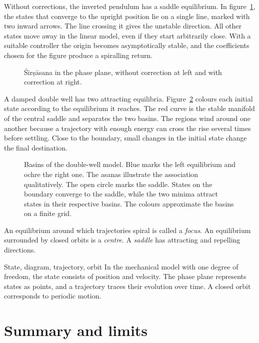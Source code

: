 Without corrections, the inverted pendulum has a saddle equilibrium. In figure~\ref{fig:selleafuochi}, the states that converge to the upright position lie on a single line, marked with two inward arrows. The line crossing it gives the unstable direction. All other states move away in the linear model, even if they start arbitrarily close. With a suitable controller the origin becomes asymptotically stable, and the coefficients chosen for the figure produce a spiralling return.

\begin{figure}
\caption{Śīrṣāsana in the phase plane, without correction at left and with correction at right.}
\label{fig:selleafuochi}
\end{figure}

A damped double well has two attracting equilibria. Figure~\ref{fig:bacini} colours each initial state according to the equilibrium it reaches. The red curve is the stable manifold of the central saddle and separates the two basins. The regions wind around one another because a trajectory with enough energy can cross the rise several times before settling. Close to the boundary, small changes in the initial state change the final destination.

\begin{figure}
\caption{Basins of the double-well model. Blue marks the left equilibrium and ochre the right one. The asanas illustrate the association qualitatively. The open circle marks the saddle. States on the boundary converge to the saddle, while the two minima attract states in their respective basins. The colours approximate the basins on a finite grid.}
\label{fig:bacini}
\end{figure}

An equilibrium around which trajectories spiral is called a \emph{focus}. An equilibrium surrounded by closed orbits is a \emph{centre}. A \emph{saddle} has attracting and repelling directions.

\begin{parola}{State, diagram, trajectory, orbit}
In the mechanical model with one degree of freedom, the state consists of position and velocity. The phase plane represents states as points, and a trajectory traces their evolution over time. A closed orbit corresponds to periodic motion.
\end{parola}

\section{Summary and limits}

